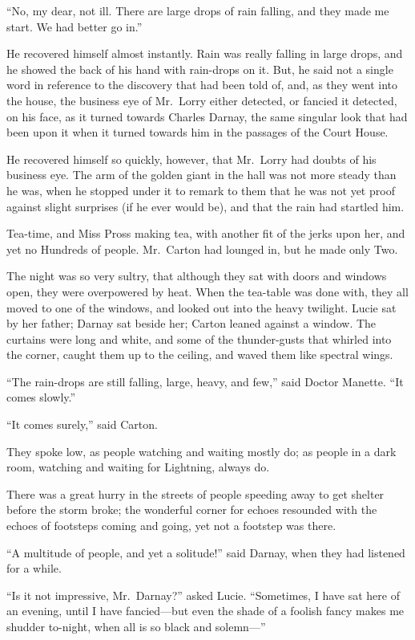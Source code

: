 ``No, my dear, not ill.  There are large drops of rain falling,
and they made me start.  We had better go in.''

He recovered himself almost instantly.  Rain was really falling in
large drops, and he showed the back of his hand with rain-drops on it.
But, he said not a single word in reference to the discovery that had
been told of, and, as they went into the house, the business eye of
Mr.\ Lorry either detected, or fancied it detected, on his face, as it
turned towards Charles Darnay, the same singular look that had been
upon it when it turned towards him in the passages of the Court House.

He recovered himself so quickly, however, that Mr.\ Lorry had doubts
of his business eye.  The arm of the golden giant in the hall was not
more steady than he was, when he stopped under it to remark to them
that he was not yet proof against slight surprises (if he ever would
be), and that the rain had startled him.

Tea-time, and Miss Pross making tea, with another fit of the jerks
upon her, and yet no Hundreds of people.  Mr.\ Carton had lounged in,
but he made only Two.

The night was so very sultry, that although they sat with doors and
windows open, they were overpowered by heat.  When the tea-table was
done with, they all moved to one of the windows, and looked out into
the heavy twilight.  Lucie sat by her father; Darnay sat beside her;
Carton leaned against a window.  The curtains were long and white,
and some of the thunder-gusts that whirled into the corner, caught
them up to the ceiling, and waved them like spectral wings.

``The rain-drops are still falling, large, heavy, and few,'' said
Doctor Manette.  ``It comes slowly.''

``It comes surely,'' said Carton.

They spoke low, as people watching and waiting mostly do; as people
in a dark room, watching and waiting for Lightning, always do.

There was a great hurry in the streets of people speeding away to get
shelter before the storm broke; the wonderful corner for echoes
resounded with the echoes of footsteps coming and going, yet not a
footstep was there.

``A multitude of people, and yet a solitude!'' said Darnay, when they
had listened for a while.

``Is it not impressive, Mr.\ Darnay?'' asked Lucie.  ``Sometimes, I have
sat here of an evening, until I have fancied---but even the shade of a
foolish fancy makes me shudder to-night, when all is so black and
solemn---''

